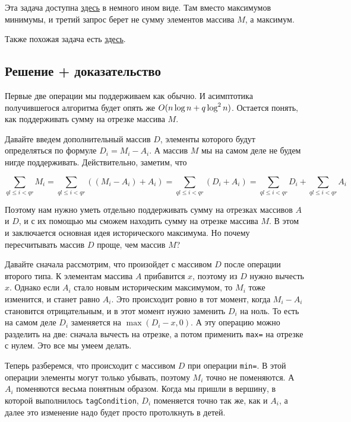Эта задача доступна \href{https://uoj.ac/problem/169}{здесь} в немного ином виде. Там вместо максимумов минимумы, и третий запрос берет не сумму элементов массива $M$, а максимум.

Также похожая задача есть \href{https://www.luogu.com.cn/problem/P4314}{здесь}.

\subsection{Решение + доказательство}

Первые две операции мы поддерживаем как обычно. И асимптотика получившегося алгоритма будет опять же $O(n \log n + q \log^2 n)$. Остается понять, как поддерживать сумму на отрезке массива $M$.

Давайте введем дополнительный массив $D$, элементы которого будут определяться по формуле $D_i = M_i - A_i$. А массив $M$ мы на самом деле не будем нигде поддерживать. Действительно, заметим, что

$$
\sum_{ql \le i < qr} M_i = \sum_{ql \le i < qr} \left( \left(M_i - A_i \right) + A_i \right) =
\sum_{ql \le i < qr} \left( D_i + A_i \right) = \sum_{ql \le i < qr} D_i + \sum_{ql \le i < qr} A_i
$$

Поэтому нам нужно уметь отдельно поддерживать сумму на отрезках массивов $A$ и $D$, и с их помощью мы сможем находить сумму на отрезке массива $M$. В этом и заключается основная идея исторического максимума. Но почему пересчитывать массив $D$ проще, чем массив $M$?

Давайте сначала рассмотрим, что произойдет с массивом $D$ после операции второго типа. К элементам массива $A$ прибавится $x$, поэтому из $D$ нужно вычесть $x$. Однако если $A_i$ стало новым историческим максимумом, то $M_i$ тоже изменится, и станет равно $A_i$. Это происходит ровно в тот момент, когда $M_i - A_i$ становится отрицательным, и в этот момент нужно заменить $D_i$ на ноль. То есть на самом деле $D_i$ заменяется на $\max(D_i - x, 0)$. А эту операцию можно разделить на две: сначала вычесть на отрезке, а потом применить \verb+max=+ на отрезке с нулем. Это все мы умеем делать.

Теперь разберемся, что происходит с массивом $D$ при операции \verb+min=+. В этой операции элементы могут только убывать, поэтому $M_i$ точно не поменяются. А $A_i$ поменяются весьма понятным образом. Когда мы пришли в вершину, в которой выполнилось \verb+tagCondition+, $D_i$ поменяется точно так же, как и $A_i$, а далее это изменение надо будет просто протолкнуть в детей.





